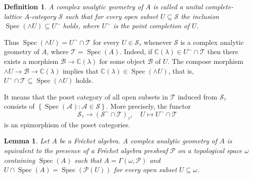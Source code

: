 \documentclass[12pt]{amsart}%
\theoremstyle{plain}
\newtheorem{definition}{Definition}
\newtheorem{lemma}{Lemma}
\numberwithin{equation}{section}
\numberwithin{equation}{section}
\numberwithin{theorem}{section}
\numberwithin{lemma}{section}
\numberwithin{remark}{section}
\numberwithin{example}{section}
\numberwithin{proposition}{section}
\numberwithin{definition}{section}
\numberwithin{corollary}{section}
\begin{document}
\begin{definition}
\label{defAG}A complex analytic geometry of $A$ is called a unital
complete-lattice $A$-category $\mathcal{S}$ such that for every open subset
$U\subseteq\mathcal{S}$ the inclusion $\operatorname{Spec}\left(  \wedge
U\right)  \subseteq U^{\sim}$ holds, where $U^{\sim}$ is the point completion
of $U$.
\end{definition}

Thus $\operatorname{Spec}\left(  \wedge U\right)  =U^{\sim}\cap\mathcal{T}$
for every $U\in\mathcal{S}_{\tau}$ whenever $\mathcal{S}$ is a complex
analytic geometry of $A$, where $\mathcal{T=}\operatorname{Spec}\left(
A\right)  $. Indeed, if $\mathbb{C}\left(  \lambda\right)  \in U^{\sim}%
\cap\mathcal{T}$ then there exists a morphism $\mathcal{B}\rightarrow
\mathbb{C}\left(  \lambda\right)  $ for some object $\mathcal{B}$ of $U$. The
compose morphism $\wedge U\rightarrow\mathcal{B}\rightarrow\mathbb{C}\left(
\lambda\right)  $ implies that $\mathbb{C}\left(  \lambda\right)
\in\operatorname{Spec}\left(  \wedge U\right)  $, that is, $U^{\sim}%
\cap\mathcal{T\subseteq}\operatorname{Spec}\left(  \wedge U\right)  $ holds.

It means that the poset category of all open subsets in $\mathcal{T}$ induced
from $\mathcal{S}_{\tau}$ consists of $\left\{  \operatorname{Spec}\left(
\mathcal{A}\right)  :\mathcal{A\in S}\right\}  $. More precisely, the functor
\[
\mathcal{S}_{\tau}\rightarrow\left(  \mathcal{S}^{\sim}\cap\mathcal{T}\right)
_{\tau},\quad U\mapsto U^{\sim}\cap\mathcal{T}%
\]
is an epimorphism of the poset categories.

\begin{lemma}
\label{lemAG1}Let $A$ be a Fr\'{e}chet algebra. A complex analytic geometry of
$A$ is equivalent to the presence of a Fr\'{e}chet algebra presheaf
$\mathcal{P}$ on a topological space $\omega$ containing $\operatorname{Spec}%
\left(  A\right)  $ such that $A=\Gamma\left(  \omega,\mathcal{P}\right)  $
and $U\cap\operatorname{Spec}\left(  A\right)  =\operatorname{Spec}\left(
\mathcal{P}\left(  U\right)  \right)  $ for every open subset $U\subseteq
\omega$.
\end{lemma}
\end{document}
